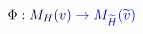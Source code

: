 \documentclass[12pt]{article}
\begin{document}
\makeatletter
\renewcommand*{\@textcolor}[3]{%
  \protect\leavevmode
  \begingroup
    \color#1{#2}#3%
  \endgroup
}
\makeatother
\begin{displaymath}
\mathcolor[RGB]{0,0,15}{\Phi} \mathcolor[RGB]{0,0,30}{:} \mathcolor[RGB]{0,0,45}{M} _ { \mathcolor[RGB]{0,0,60}{H} } \mathcolor[RGB]{0,0,75}{(} \mathcolor[RGB]{0,0,90}{v} \mathcolor[RGB]{0,0,105}{)} \mathcolor[RGB]{0,0,120}{\to} \mathcolor[RGB]{0,0,135}{M} _ { \mathcolor[RGB]{0,0,150}{\widetilde { \mathcolor[RGB]{0,0,165}{H} } } } \mathcolor[RGB]{0,0,180}{(} \mathcolor[RGB]{0,0,195}{\widetilde { \mathcolor[RGB]{0,0,210}{v} } } \mathcolor[RGB]{0,0,225}{)}
\end{displaymath}
\end{document}
